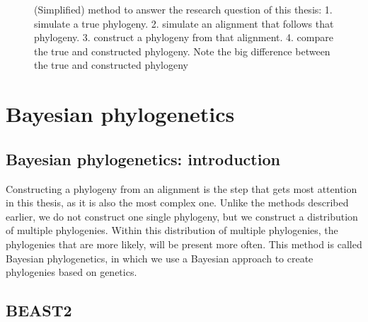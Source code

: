 \begin{figure}[H]
{
  }
  \caption{
    (Simplified) method to answer the research question of this thesis:
    1. simulate a true phylogeny. 
    2. simulate an alignment that follows that phylogeny. 
    3. construct a phylogeny from that alignment.
    4. compare the true and constructed phylogeny.
    Note the big difference between the true and constructed phylogeny
  }
  \label{fig:research_workflow_single}
\end{figure}

\section{Bayesian phylogenetics}



\subsection{Bayesian phylogenetics: introduction}

Constructing a phylogeny from an alignment is the step that
gets most attention in this thesis, as it is also the most complex
one. Unlike the methods described earlier, 
we do not construct one single phylogeny, 
but we construct a distribution of multiple phylogenies.
Within this distribution of multiple phylogenies, the phylogenies
that are more likely, will be present more often.
This method is called Bayesian phylogenetics, in which we use
a Bayesian approach to create phylogenies based on genetics.

\subsection{BEAST2}

